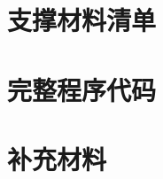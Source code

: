 \documentclass[withoutpreface,bwprint]{format}
\begin{document}
\section{支撑材料清单}
\label{app:support-index}

\section{完整程序代码}
\label{app:source-code}
% 

\section{补充材料}
\label{app:supplement}
\end{document}
